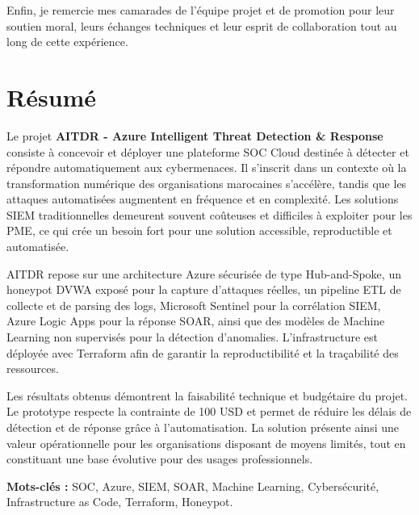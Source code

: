 \documentclass[11pt,a4paper]{report}
\begin{document}
Enfin, je remercie mes camarades de l'équipe projet et de promotion pour leur soutien moral, leurs échanges techniques et leur esprit de collaboration tout au long de cette expérience.

\chapter*{Résumé}

Le projet \textbf{AITDR - Azure Intelligent Threat Detection \& Response} consiste à concevoir et déployer une plateforme SOC Cloud destinée à détecter et répondre automatiquement aux cybermenaces. Il s'inscrit dans un contexte où la transformation numérique des organisations marocaines s'accélère, tandis que les attaques automatisées augmentent en fréquence et en complexité. Les solutions SIEM traditionnelles demeurent souvent coûteuses et difficiles à exploiter pour les PME, ce qui crée un besoin fort pour une solution accessible, reproductible et automatisée.

AITDR repose sur une architecture Azure sécurisée de type Hub-and-Spoke, un honeypot DVWA exposé pour la capture d'attaques réelles, un pipeline ETL de collecte et de parsing des logs, Microsoft Sentinel pour la corrélation SIEM, Azure Logic Apps pour la réponse SOAR, ainsi que des modèles de Machine Learning non supervisés pour la détection d'anomalies. L'infrastructure est déployée avec Terraform afin de garantir la reproductibilité et la traçabilité des ressources.

Les résultats obtenus démontrent la faisabilité technique et budgétaire du projet. Le prototype respecte la contrainte de 100 USD et permet de réduire les délais de détection et de réponse grâce à l'automatisation. La solution présente ainsi une valeur opérationnelle pour les organisations disposant de moyens limités, tout en constituant une base évolutive pour des usages professionnels.

\textbf{Mots-clés :} SOC, Azure, SIEM, SOAR, Machine Learning, Cybersécurité, Infrastructure as Code, Terraform, Honeypot.

\tableofcontents

\listoffigures
\end{document}

